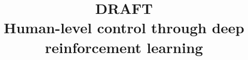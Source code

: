 \documentclass[12pt, conference, compsoc]{IEEEtran}
\begin{document}
%
\title{DRAFT\\Human-level control through deep reinforcement learning}


\author{
\and
{}
}


%








\maketitle
\end{document}
